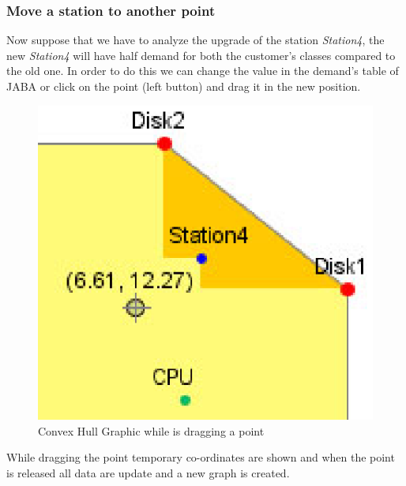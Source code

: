 \subsubsection{Move a station to another point}
\label{sec:jaba:convexHullDrag}
Now suppose  that we have to analyze the upgrade of the station \emph{Station4}, the new \emph{Station4} will have half demand for both the customer's classes compared to the old one. In order to do this we can change the value in the demand's table of JABA or click on the point (left button) and drag it in the new position.
\begin{figure}[htbp]
    \begin{center}
        \includegraphics[scale=.7]{img/jaba/convexHullDragPoint}
    \end{center}
    \caption{Convex Hull Graphic while is dragging a point}
    \label{fig:jaba:convexHullDragPoint}
\end{figure}

While dragging the point temporary co-ordinates are shown and when the point is released all data are update and a new graph is created.

